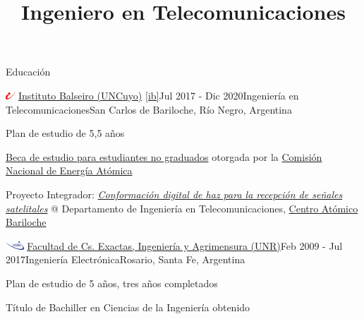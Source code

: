 \documentclass{resume} %
\title{\textbf{Ingeniero en Telecomunicaciones}}
\begin{document}

\begin{rSection}{Educación}

    \begin{rSubsection}{\includegraphics[height=0.3cm]{images/ib-logo.png} \href{https://www.ib.edu.ar/}{Instituto Balseiro (UNCuyo)} \ref{ib}}{Jul 2017 - Dic 2020}{Ingeniería en Telecomunicaciones}{San Carlos de Bariloche, Río Negro, Argentina}
        \item Plan de estudio de 5,5 años
        \item \href{https://www.ib.edu.ar/ingreso-a-carreras/becas.html}{Beca de estudio para estudiantes no graduados} otorgada por la \href{https://www.argentina.gob.ar/cnea}{Comisión Nacional de Energía Atómica}
        \item Proyecto Integrador: \href{https://github.com/grigosback/digital-beamforming}{\textit{Conformación digital de haz para la recepción de señales satelitales}} @ Departamento de Ingeniería en Telecomunicaciones, \href{https://www.argentina.gob.ar/cnea/centros-atomicos/cab}{Centro Atómico Bariloche}
    \end{rSubsection}

    \begin{rSubsection}{\includegraphics[height=0.3cm]{images/fceia.png} \href{https://web.fceia.unr.edu.ar/}{Facultad de Cs. Exactas, Ingeniería y Agrimensura (UNR)}}{Feb 2009 - Jul 2017}{Ingeniería Electrónica}{Rosario, Santa Fe, Argentina}
        \item Plan de estudio de 5 años, tres años completados
        \item Título de Bachiller en Ciencias de la Ingeniería obtenido
    \end{rSubsection}
\end{rSection}

\end{document}
